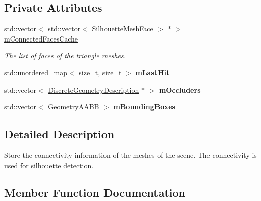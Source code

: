 \subsection*{Private Attributes}
\begin{DoxyCompactItemize}
\item 
std\+::vector$<$ std\+::vector$<$ \mbox{\hyperlink{classvisilib_1_1_silhouette_mesh_face}{Silhouette\+Mesh\+Face}} $>$ $\ast$ $>$ \mbox{\hyperlink{classvisilib_1_1_geometry_occluder_set_a96611893ad5c36867c415cf68cd320c4}{m\+Connected\+Faces\+Cache}}
\begin{DoxyCompactList}\small\item\em The list of faces of the triangle meshes. \end{DoxyCompactList}\item 
\mbox{\label{classvisilib_1_1_geometry_occluder_set_aac4816a11b1e4edc9193696c906ab206}} 
std\+::unordered\+\_\+map$<$ size\+\_\+t, size\+\_\+t $>$ {\bfseries m\+Last\+Hit}
\item 
\mbox{\label{classvisilib_1_1_geometry_occluder_set_a0564f625a9de859d38231bf28dbbdd92}} 
std\+::vector$<$ \mbox{\hyperlink{structvisilib_1_1_discrete_geometry_description}{Discrete\+Geometry\+Description}} $\ast$ $>$ {\bfseries m\+Occluders}
\item 
\mbox{\label{classvisilib_1_1_geometry_occluder_set_a61e7f53997ce8a65ed8bda96773ec406}} 
std\+::vector$<$ \mbox{\hyperlink{classvisilib_1_1_geometry_a_a_b_b}{Geometry\+A\+A\+BB}} $>$ {\bfseries m\+Bounding\+Boxes}
\end{DoxyCompactItemize}


\subsection{Detailed Description}
Store the connectivity information of the meshes of the scene. The connectivity is used for silhouette detection. 

\subsection{Member Function Documentation}
\mbox{\label{classvisilib_1_1_geometry_occluder_set_a653a182d2a7f4ac669fe67693574b128}} 
